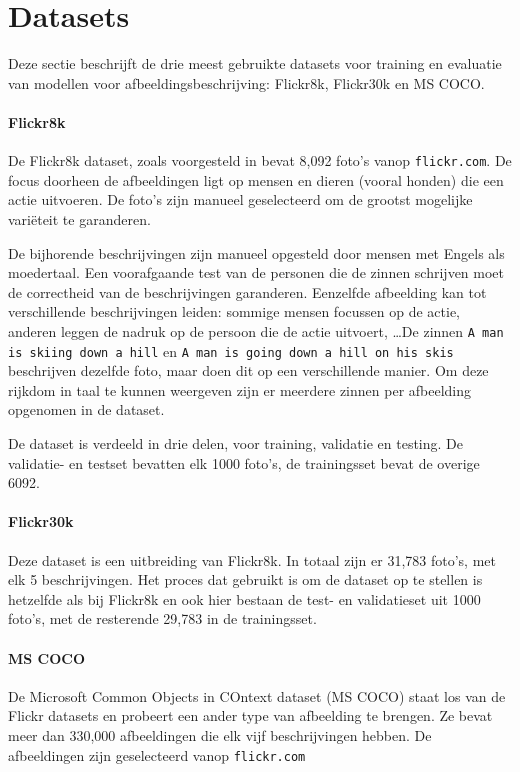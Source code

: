 \section{Datasets}
\label{sec:Datasets}
Deze sectie beschrijft de drie meest gebruikte datasets voor training en evaluatie van modellen voor afbeeldingsbeschrijving: Flickr8k, Flickr30k en MS COCO.

\paragraph{Flickr8k}
\label{par:Flickr8k}
De Flickr8k dataset, zoals voorgesteld in  bevat 8,092 foto's vanop \texttt{flickr.com}. De focus doorheen de afbeeldingen ligt op mensen en dieren (vooral honden) die een actie uitvoeren. De foto's zijn manueel geselecteerd om de grootst mogelijke vari\"eteit te garanderen.

De bijhorende beschrijvingen zijn manueel opgesteld door mensen met Engels als moedertaal. Een voorafgaande test van de personen die de zinnen schrijven moet de correctheid van de beschrijvingen garanderen. Eenzelfde afbeelding kan tot verschillende beschrijvingen leiden: sommige mensen focussen op de actie, anderen leggen de nadruk op de persoon die de actie uitvoert, \ldots De zinnen \texttt{A man is skiing down a hill} en \texttt{A man is going down a hill on his skis} beschrijven dezelfde foto, maar doen dit op een verschillende manier. Om deze rijkdom in taal te kunnen weergeven zijn er meerdere zinnen per afbeelding opgenomen in de dataset.

De dataset is verdeeld in drie delen, voor training, validatie en testing. De validatie- en testset bevatten elk 1000 foto's, de trainingsset bevat de overige 6092.


\paragraph{Flickr30k}
\label{par:Flickr30k}
Deze dataset  is een uitbreiding van Flickr8k. In totaal zijn er 31,783 foto's, met elk 5 beschrijvingen. Het proces dat gebruikt is om de dataset op te stellen is hetzelfde als bij Flickr8k  en ook hier bestaan de test- en validatieset uit 1000 foto's, met de resterende 29,783 in de trainingsset.


\paragraph{MS COCO}
\label{par:MS COCO}
De Microsoft Common Objects in COntext dataset (MS COCO)  staat los van de Flickr datasets en probeert een ander type van afbeelding te brengen. Ze bevat meer dan 330,000 afbeeldingen die elk vijf beschrijvingen hebben. De afbeeldingen zijn geselecteerd vanop \texttt{flickr.com}

